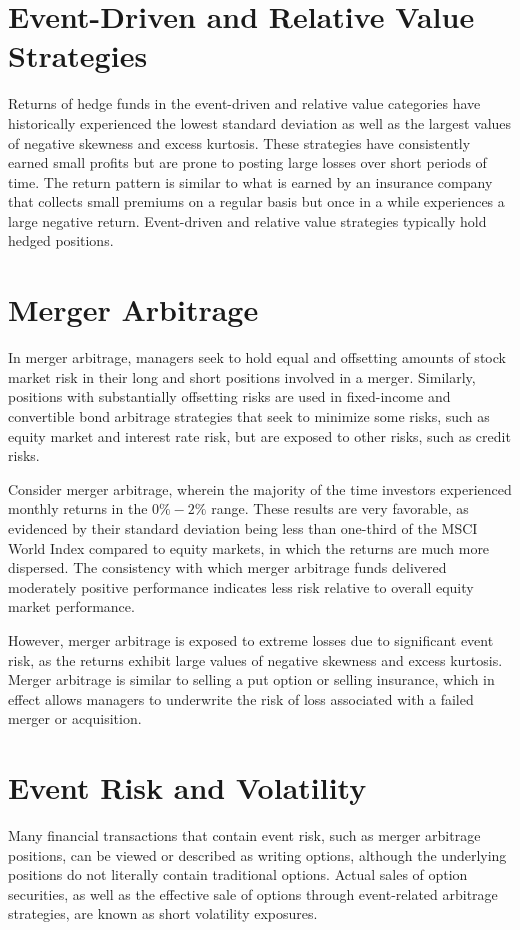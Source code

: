 \documentclass[11pt]{article}
\begin{document}
\section*{Event-Driven and Relative Value Strategies}
Returns of hedge funds in the event-driven and relative value categories have historically experienced the lowest standard deviation as well as the largest values of negative skewness and excess kurtosis. These strategies have consistently earned small profits but are prone to posting large losses over short periods of time. The return pattern is similar to what is earned by an insurance company that collects small premiums on a regular basis but once in a while experiences a large negative return. Event-driven and relative value strategies typically hold hedged positions.

\section*{Merger Arbitrage}
In merger arbitrage, managers seek to hold equal and offsetting amounts of stock market risk in their long and short positions involved in a merger. Similarly, positions with substantially offsetting risks are used in fixed-income and convertible bond arbitrage strategies that seek to minimize some risks, such as equity market and interest rate risk, but are exposed to other risks, such as credit risks.

Consider merger arbitrage, wherein the majority of the time investors experienced monthly returns in the $0 \%-2 \%$ range. These results are very favorable, as evidenced by their standard deviation being less than one-third of the MSCI World Index compared to equity markets, in which the returns are much more dispersed. The consistency with which merger arbitrage funds delivered moderately positive performance indicates less risk relative to overall equity market performance.

However, merger arbitrage is exposed to extreme losses due to significant event risk, as the returns exhibit large values of negative skewness and excess kurtosis. Merger arbitrage is similar to selling a put option or selling insurance, which in effect allows managers to underwrite the risk of loss associated with a failed merger or acquisition.

\section*{Event Risk and Volatility}
Many financial transactions that contain event risk, such as merger arbitrage positions, can be viewed or described as writing options, although the underlying positions do not literally contain traditional options. Actual sales of option securities, as well as the effective sale of options through event-related arbitrage strategies, are known as short volatility exposures.
\end{document}

